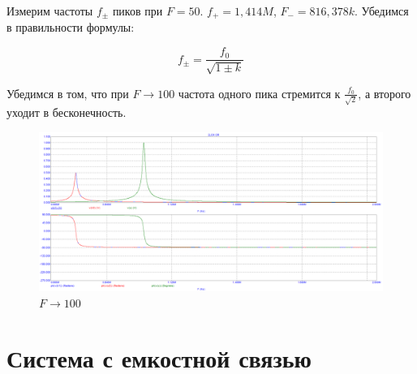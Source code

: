 \documentclass[a4paper, 12pt]{article}%
\begin{document}
\begin{enumerate}
Измерим частоты $f_{\pm}$ пиков при $F = 50$. $f_+ = 1,414M$, $F_- = 816,378k$. Убедимся в правильности формулы:

\[f_{\pm} = \frac{f_0}{\sqrt{1\pm k}}\]

Убедимся в том, что при $F \longrightarrow 100$ частота одного пика стремится к $\frac{f_0}{\sqrt{2}}$, а второго уходит в бесконечность.

\begin{figure}[h!]
\centering
\includegraphics[scale = 0.4]{images/plot11_2.png}
\caption{$F \longrightarrow 100$}
\label{fig:Image1}
\end{figure}

\end{enumerate}

\section{Система с емкостной связью}
\end{document}
